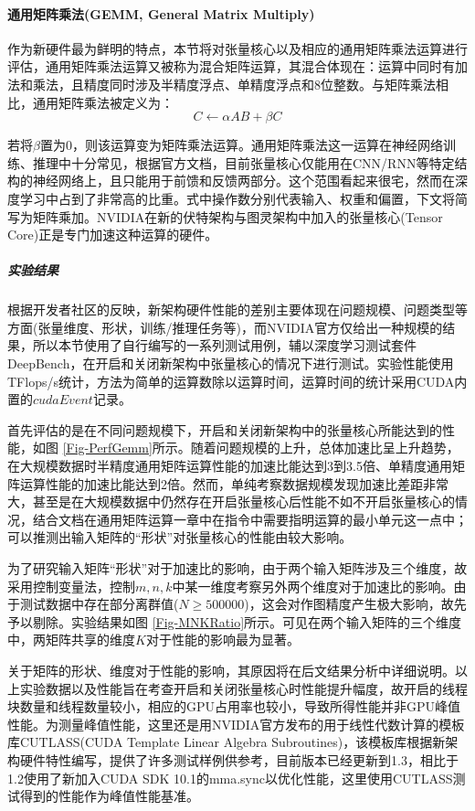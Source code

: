 \paragraph{通用矩阵乘法(GEMM, General Matrix Multiply)}
\par 作为新硬件最为鲜明的特点，本节将对张量核心以及相应的通用矩阵乘法运算进行评估，通用矩阵乘法运算又被称为混合矩阵运算，其混合体现在：运算中同时有加法和乘法，且精度同时涉及半精度浮点、单精度浮点和8位整数。与矩阵乘法相比，通用矩阵乘法被定义为：
$$ C \leftarrow \alpha AB + \beta C $$
\par 若将$ \beta $置为0，则该运算变为矩阵乘法运算。通用矩阵乘法这一运算在神经网络训练、推理中十分常见，根据官方文档，目前张量核心仅能用在CNN/RNN等特定结构的神经网络上，且只能用于前馈和反馈两部分。这个范围看起来很宅，然而在深度学习中占到了非常高的比重。式中操作数分别代表输入、权重和偏置，下文将简写为矩阵乘加。NVIDIA在新的伏特架构与图灵架构中加入的张量核心(Tensor Core)正是专门加速这种运算的硬件。
\subparagraph{实验结果}
\par 根据开发者社区的反映，新架构硬件性能的差别主要体现在问题规模、问题类型等方面(张量维度、形状，训练/推理任务等)，而NVIDIA官方仅给出一种规模的结果，所以本节使用了自行编写的一系列测试用例，辅以深度学习测试套件DeepBench\cite{DEEPBENCH}，在开启和关闭新架构中张量核心的情况下进行测试。实验性能使用TFlops/s统计，方法为简单的运算数除以运算时间，运算时间的统计采用CUDA内置的$ cudaEvent $记录。
\par 首先评估的是在不同问题规模下，开启和关闭新架构中的张量核心所能达到的性能，如图 \ref{Fig-PerfGemm}所示。随着问题规模的上升，总体加速比呈上升趋势，在大规模数据时半精度通用矩阵运算性能的加速比能达到3到3.5倍、单精度通用矩阵运算性能的加速比能达到2倍。然而，单纯考察数据规模发现加速比差距非常大，甚至是在大规模数据中仍然存在开启张量核心后性能不如不开启张量核心的情况，结合文档在通用矩阵运算一章中在指令中需要指明运算的最小单元这一点中\cite{PTX}；可以推测出输入矩阵的“形状”对张量核心的性能由较大影响。
\par 为了研究输入矩阵“形状”对于加速比的影响，由于两个输入矩阵涉及三个维度，故采用控制变量法，控制$ m,n,k $中某一维度考察另外两个维度对于加速比的影响。由于测试数据中存在部分离群值($ N\geq 500000 $)，这会对作图精度产生极大影响，故先予以剔除。实验结果如图 \ref{Fig-MNKRatio}所示。可见在两个输入矩阵的三个维度中，两矩阵共享的维度$ K $对于性能的影响最为显著。
\par 关于矩阵的形状、维度对于性能的影响，其原因将在后文结果分析中详细说明。以上实验数据以及性能旨在考查开启和关闭张量核心时性能提升幅度，故开启的线程块数量和线程数量较小，相应的GPU占用率也较小，导致所得性能并非GPU峰值性能。为测量峰值性能，这里还是用NVIDIA官方发布的用于线性代数计算的模板库CUTLASS(CUDA Template Linear Algebra Subroutines)，该模板库根据新架构硬件特性编写，提供了许多测试样例供参考，目前版本已经更新到1.3，相比于1.2使用了新加入CUDA SDK 10.1的mma.sync以优化性能，这里使用CUTLASS测试得到的性能作为峰值性能基准。
